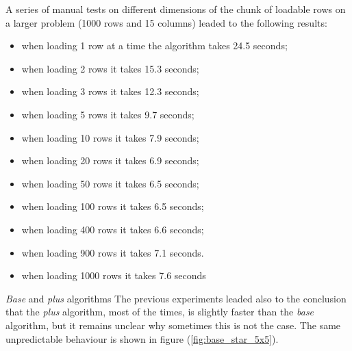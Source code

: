\documentclass{beamer}
\begin{document}
\begin{frame}
    A series of manual tests on
    different dimensions of the chunk of loadable rows on a larger problem (1000 rows
    and 15 columns) leaded to the following results:
    \begin{itemize}
        \item when loading 1 row at a time the algorithm takes 24.5 seconds;
        \item when loading 2 rows it takes 15.3 seconds;
        \item when loading 3 rows it takes 12.3 seconds;
        \item when loading 5 rows it takes 9.7 seconds;
        \item when loading 10 rows it takes 7.9 seconds;
        \item when loading 20 rows it takes 6.9 seconds;
        \item when loading 50 rows it takes 6.5 seconds;
        \item when loading 100 rows it takes 6.5 seconds;
        \item when loading 400 rows it takes 6.6 seconds;
        \item when loading 900 rows it takes 7.1 seconds.
        \item when loading 1000 rows it takes 7.6 seconds
    \end{itemize}
    \end{frame}

\begin{frame}{\textit{Base} and \textit{plus} algorithms}
    The previous experiments leaded also to the conclusion that the \textit{plus} algorithm, most of the times,
    is slightly faster than the \textit{base} algorithm, but it remains unclear
    why sometimes this is not the case.
    The same unpredictable behaviour is shown in figure (\ref{fig:base_star_5x5}).
\end{frame}
\end{document}
